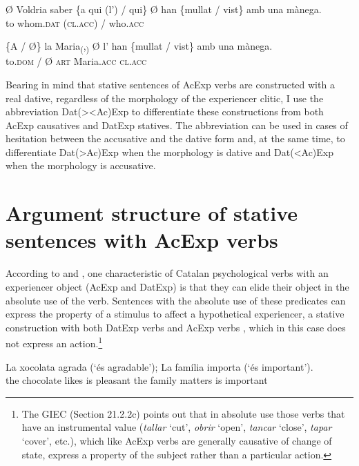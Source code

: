 \documentclass[output=paper,colorlinks,citecolor=brown,nonflat]{./langscibook}
\begin{document}
 \ex \label{ex:royo:17d}
 \gll Ø Voldria saber \{a qui (l’) / qui\} Ø han \{mullat / vist\} amb una mànega.\\
 to whom.\textsc{dat} (\textsc{cl.acc}) / who.\textsc{acc} \\
\glt {}
 
 \ex \label{ex:royo:17e}
 \gll \{A / Ø\} la Maria\textsubscript{(},\textsubscript{)} Ø l’ han \{mullat / vist\} amb una mànega.\\
 to.\textsc{dom} / Ø \textsc{art} Maria.\textsc{acc} \textsc{cl.acc} \\
\glt {}
 
 \z
 \z 

Bearing in mind that stative sentences of AcExp verbs are constructed with a real dative, regardless of the morphology of the experiencer clitic, I use the abbreviation Dat(>{\textbar}<Ac)Exp to differentiate these constructions from both AcExp causatives and DatExp statives. The abbreviation can be used in cases of hesitation between the accusative and the dative form and, at the same time, to differentiate Dat(>Ac)Exp when the morphology is dative and Dat(<Ac)Exp when the morphology is accusative.

\section{Argument structure of stative sentences with AcExp verbs}\label{sec:royo:5}

According to \citet[Sections 13.3.6.2a-b and 13.3.7.2b]{Rossello2008} and \citet[21.2.2b and 21.5a]{GIEC2016}, one characteristic of Catalan psychological verbs with an experiencer object (AcExp and DatExp) is that they can elide their object in the absolute use of the verb. Sentences with the absolute use of these predicates can express the property of a stimulus to affect a hypothetical experiencer, a stative construction with both DatExp verbs  and AcExp verbs , which in this case does not express an action.\footnote{The GIEC (Section 21.2.2c) points out that in absolute use those verbs that have an instrumental value (\textit{tallar} ‘cut’, \textit{obrir} ‘open’, \textit{tancar} ‘close’, \textit{tapar} ‘cover’, etc.), which like AcExp verbs are generally causative of change of state, express a property of the subject rather than a particular action.}

\ea%
 \label{ex:royo:18}
 \ea \label{ex:royo:18a}
 \gll La xocolata agrada (‘és agradable’); La família importa (‘és important’). \\
 the chocolate likes is pleasant the family matters is important\\
 \glt {}
 
\end{document}
